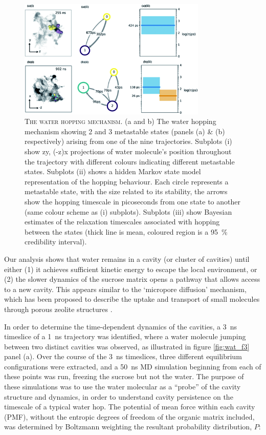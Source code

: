 \begin{figure}
    \centering
    \includegraphics[width=0.8\textwidth]{chapters/water_hopping/figures/f4.png}
    \caption[The water hopping mechanism]{\textsc{The water hopping mechanism}. (a and b) The water hopping mechanism showing 2 and 3 metastable states (panels (a) \& (b) respectively) arising from one of the nine trajectories. Subplots (i) show zy, (-z)x projections of water molecule's position throughout the trajectory with different colours indicating different metastable states. Subplots (ii) shows a hidden Markov state model representation of the hopping behaviour. Each circle represents a metastable state, with the size related to its stability, the arrows show the hopping timescale in picoseconds from one state to another (same colour scheme as (i) subplots). Subplots (iii) show Bayesian estimates of the relaxation timescales associated with hopping between the states (thick line is mean, coloured region is a \SI{95}{\percent} credibility interval).}
    \label{fig:wat_f4}
\end{figure}

Our analysis shows that water remains in a cavity (or cluster of cavities) until either (1) it achieves sufficient kinetic energy to escape the local environment, or (2) the slower dynamics of the sucrose matrix opens a pathway that allows access to a new cavity. This appears similar to the `micropore diffusion’ mechanism, which has been proposed to describe the uptake and transport of small molecules through porous zeolite structures \cite{Krishna1997}.

In order to determine the time-dependent dynamics of the cavities, a \SI{3}{\nano\second} timeslice of a \SI{1}{\nano\second} trajectory was identified, where a water molecule jumping between two distinct cavities was observed, as illustrated in figure \ref{fig:wat_f3} panel (a). Over the course of the \SI{3}{\nano\second} timeslices,  three different equilibrium configurations were extracted, and a \SI{50}{\nano\second} MD simulation beginning from each of these points was run, freezing the sucrose but not the water. The purpose of these simulations was to use the water molecular as a ``probe'' of the cavity structure and dynamics, in order to understand cavity persistence on the timescale of a typical water hop. The potential of mean force within each cavity (PMF), without the entropic degrees of freedom of the organic matrix included, was determined by Boltzmann weighting the resultant probability distribution, $P$: 

